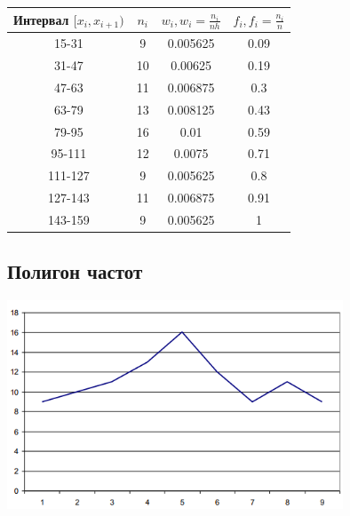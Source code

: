 \documentclass[12pt,a4paper]{report}
\begin{document}
\begin{tabular}{|c|c|c|c|}
	\hline
	Интервал $[x_i, x_{i+1})$ & $n_i$ & $w_i, w_i=\frac{n_i}{nh}$ & $f_i, f_i=\frac{n_i}{n}$ \\
	\hline
	15-31                     & 9     & 0.005625                  & 0.09                     \\
	\hline
	31-47                     & 10    & 0.00625                   & 0.19                     \\
	\hline
	47-63                     & 11    & 0.006875                  & 0.3                      \\
	\hline
	63-79                     & 13    & 0.008125                  & 0.43                     \\
	\hline
	79-95                     & 16    & 0.01                      & 0.59                     \\
	\hline
	95-111                    & 12    & 0.0075                    & 0.71                     \\
	\hline
	111-127                   & 9     & 0.005625                  & 0.8                      \\
	\hline
	127-143                   & 11    & 0.006875                  & 0.91                     \\
	\hline
	143-159                   & 9     & 0.005625                  & 1                        \\
	\hline
\end{tabular}

\subsection*{Полигон частот}
\begin{center}
	\includegraphics[width=10cm]{polygon.png}
\end{center}
\end{document}
